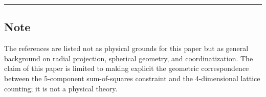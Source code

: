 \documentclass[
]{article}
\begin{document}
\begin{center}\rule{0.5\linewidth}{0.5pt}\end{center}

\subsection{Note}\label{note}

The references are listed not as physical grounds for this paper but as
general background on radial projection, spherical geometry, and
coordinatization. The claim of this paper is limited to making explicit
the geometric correspondence between the 5-component sum-of-squares
constraint and the 4-dimensional lattice counting; it is not a physical
theory.
\end{document}
